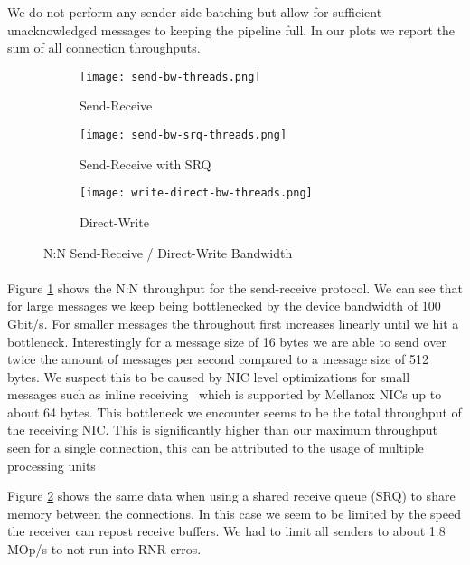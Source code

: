 We do not perform any sender side batching but allow for sufficient unacknowledged messages to keeping the pipeline full.
In our plots we report the sum of all connection throughputs.

\begin{figure}[ht]
  \centering
\begin{subfigure}[b]{0.49\textwidth}
  \centering
  \texttt{[image: send-bw-threads.png]}
  \caption{Send-Receive}
  \label{fig:plot-sndrcv-bw-thread-nosrq}
\end{subfigure}
\begin{subfigure}[b]{0.49\textwidth}
  \centering
  \texttt{[image: send-bw-srq-threads.png]}
  \caption{Send-Receive with SRQ}
  \label{fig:plot-sndrcv-bw-thread-srq}
\end{subfigure}
  \begin{subfigure}[b]{0.48\textwidth}
  \centering
  \texttt{[image: write-direct-bw-threads.png]}
  \caption{Direct-Write}
  \label{fig:plot-wdir-bw-threads}
  \end{subfigure}
\caption{N:N Send-Receive / Direct-Write Bandwidth}
  \label{fig:plot-sndrcv-bw-thread}
\end{figure}


\paragraph{} Figure \ref{fig:plot-sndrcv-bw-thread-nosrq} shows the N:N throughput for the send-receive protocol.
We can see that for large messages we keep being bottlenecked by the device bandwidth of 100 Gbit/s. For smaller
messages the throughout first increases linearly until we hit a bottleneck. Interestingly for a message size 
of 16 bytes we are able to send over twice the amount of messages per second compared to a message size of 512 bytes.
We suspect this to be caused by NIC level optimizations for small messages such as inline receiving~\cite{anuj-guide} which 
is supported by Mellanox NICs up to about 64 bytes. This bottleneck we encounter seems to be the total throughput of the 
receiving NIC. This is significantly higher than our maximum throughput seen for a single connection, this can be 
attributed to the usage of multiple processing units~\cite{anuj-guide}


Figure \ref{fig:plot-sndrcv-bw-thread-srq} shows the same data when using a shared receive queue (SRQ) to share memory
between the connections. In this case we seem to be limited by the speed the receiver can repost receive buffers. We
had to limit all senders to about 1.8 MOp/s to not run into RNR erros.

